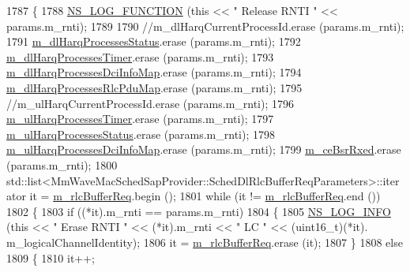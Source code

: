 \begin{DoxyCode}
1787 \{
1788   \hyperlink{log-macros-disabled_8h_a90b90d5bad1f39cb1b64923ea94c0761}{NS\_LOG\_FUNCTION} (\textcolor{keyword}{this} << \textcolor{stringliteral}{" Release RNTI "} << params.m\_rnti);
1789 
1790   \textcolor{comment}{//m\_dlHarqCurrentProcessId.erase (params.m\_rnti);}
1791   \hyperlink{classns3_1_1MmWaveFlexTtiMaxWeightMacScheduler_a798ed476b56504b548455147167df24b}{m\_dlHarqProcessesStatus}.erase  (params.m\_rnti);
1792   \hyperlink{classns3_1_1MmWaveFlexTtiMaxWeightMacScheduler_a60826192a5d859c1a1bb20955b3ad981}{m\_dlHarqProcessesTimer}.erase (params.m\_rnti);
1793   \hyperlink{classns3_1_1MmWaveFlexTtiMaxWeightMacScheduler_ac833e86e5419d19a445f1e359d06486e}{m\_dlHarqProcessesDciInfoMap}.erase  (params.m\_rnti);
1794   \hyperlink{classns3_1_1MmWaveFlexTtiMaxWeightMacScheduler_aa9cdf43f057d1bd8e1cfcf2a21ea89f0}{m\_dlHarqProcessesRlcPduMap}.erase  (params.m\_rnti);
1795   \textcolor{comment}{//m\_ulHarqCurrentProcessId.erase  (params.m\_rnti);}
1796   \hyperlink{classns3_1_1MmWaveFlexTtiMaxWeightMacScheduler_aa609a40ebf5eb905696d2db4e1443961}{m\_ulHarqProcessesTimer}.erase (params.m\_rnti);
1797   \hyperlink{classns3_1_1MmWaveFlexTtiMaxWeightMacScheduler_aeff65837d6604471dd667bfe89240de2}{m\_ulHarqProcessesStatus}.erase  (params.m\_rnti);
1798   \hyperlink{classns3_1_1MmWaveFlexTtiMaxWeightMacScheduler_a637f826b85b2eeb88c80b53b468fdfcf}{m\_ulHarqProcessesDciInfoMap}.erase  (params.m\_rnti);
1799   \hyperlink{classns3_1_1MmWaveFlexTtiMaxWeightMacScheduler_a62257924c5d3720000812905ed679dfd}{m\_ceBsrRxed}.erase (params.m\_rnti);
1800   std::list<MmWaveMacSchedSapProvider::SchedDlRlcBufferReqParameters>::iterator it = 
      \hyperlink{classns3_1_1MmWaveFlexTtiMaxWeightMacScheduler_ad93ce7bf5f3377a1cfa4bc54b7e7b551}{m\_rlcBufferReq}.begin ();
1801   \textcolor{keywordflow}{while} (it != \hyperlink{classns3_1_1MmWaveFlexTtiMaxWeightMacScheduler_ad93ce7bf5f3377a1cfa4bc54b7e7b551}{m\_rlcBufferReq}.end ())
1802     \{
1803       \textcolor{keywordflow}{if} ((*it).m\_rnti == params.m\_rnti)
1804         \{
1805           \hyperlink{group__logging_gafbd73ee2cf9f26b319f49086d8e860fb}{NS\_LOG\_INFO} (\textcolor{keyword}{this} << \textcolor{stringliteral}{" Erase RNTI "} << (*it).m\_rnti << \textcolor{stringliteral}{" LC "} << (uint16\_t)(*it).
      m\_logicalChannelIdentity);
1806           it = \hyperlink{classns3_1_1MmWaveFlexTtiMaxWeightMacScheduler_ad93ce7bf5f3377a1cfa4bc54b7e7b551}{m\_rlcBufferReq}.erase (it);
1807         \}
1808       \textcolor{keywordflow}{else}
1809         \{
1810           it++;

\end{DoxyCode}
